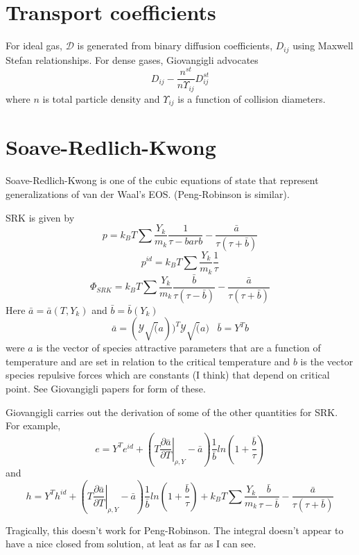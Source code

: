 \documentclass[11pt]{article}
\begin{document}
\section{Transport coefficients}

For ideal gas, $\mathcal{D}$ is generated from binary diffusion coefficients, $D_{ij}$ using
Maxwell Stefan relationships.
For dense gases, Giovangigli advocates
\[
D_{ij} - \frac{n^{st}}{n \Upsilon_{ij}} D_{ij}^{st}
\]
where $n$ is total particle density and $\Upsilon_{ij}$ is a function of collision diameters.

\section{Soave-Redlich-Kwong}

Soave-Redlich-Kwong is one of the cubic equations of state that represent generalizations of
van der Waal's EOS.
(Peng-Robinson is similar).

SRK is given by
\[
p = k_B T \sum \frac{Y_k}{m_k} \frac{1}{\tau -bar{b}} - \frac{\bar{a}}{\tau(\tau + \bar{b})}
\]
\[
p^{id} = k_B T \sum \frac{Y_k}{m_k} \frac{1}{\tau}
\]
\[
\Phi_{SRK}
= k_B T \sum \frac{Y_k}{m_k} \frac{\bar{b}}{\tau(\tau -\bar{b})} - \frac{\bar{a}}{\tau(\tau + \bar{b})}
\]
Here $\bar{a} = \bar{a}(T, Y_k)$ and $\bar{b} = \bar{b}(Y_k)$
\[
\bar{a} = (\mathcal{Y}\sqrt(a))^T  \mathcal{Y}\sqrt(a) \;\;\;  \bar{b} = Y^T b
\]
were $a$ is the vector of species attractive parameters that are a function of temperature and are
set in relation to the critical temperature and $b$ is the vector species repulsive forces which are
constants (I think) that depend on critical point.
See Giovangigli papers for form of these.

Giovangigli carries out the derivation of some of the other quantities for SRK. For example,
\[
e = Y^T e^{id} + ( T \left . \frac{\partial \bar{a}}{\partial T} \right |_{\rho,Y} - \bar{a})
\frac{1}{\bar{b}} ln ( 1 + \frac{\bar{b}}{\tau})
\]
and
\[
h = Y^T h^{id} + ( T \left . \frac{\partial \bar{a}}{\partial T} \right |_{\rho,Y} - \bar{a})
\frac{1}{\bar{b}} ln ( 1 + \frac{\bar{b}}{\tau})
+ 
k_B T \sum \frac{Y_k}{m_k} \frac{\bar{b}}{\tau -\bar{b}} - \frac{\bar{a}}{\tau(\tau + \bar{b})}
\]

Tragically, this doesn't work for Peng-Robinson.  The integral doesn't appear to have a nice closed from solution, at leat as far as I can
see.



\end{document}
